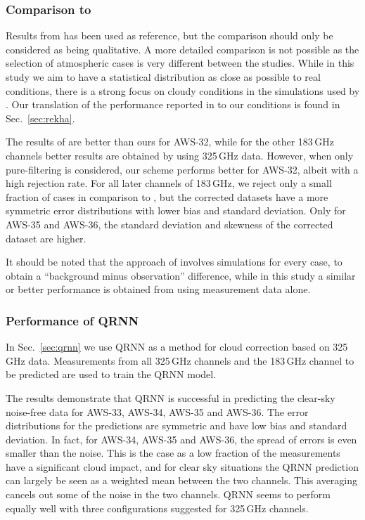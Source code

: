 \documentclass[12pt]{article}
\begin{document}
\subsubsection{Comparison to \citet{rekha2012potential}}
%
Results from \citet{rekha2012potential} has been used as reference, but the
comparison should only be considered as being qualitative. A more detailed
comparison is not possible as the selection of atmospheric cases is very
different between the studies. While in this study we aim to have a statistical
distribution as close as possible to real conditions, there is a strong focus on
cloudy conditions in the simulations used by \citet{rekha2012potential}. Our
translation of the performance reported in \citet{rekha2012potential} to our
conditions is found in Sec.~\ref{sec:rekha}.

The results of \citet{rekha2012potential} are better than ours for AWS-32, while
for the other 183\,GHz channels better results are obtained by using 325\,GHz
data. However, when only pure-filtering is considered, our scheme performs
better for AWS-32, albeit with a high rejection rate. For all later channels of
183\,GHz, we reject only a small fraction of cases in comparison to
\citet{rekha2012potential}, but the corrected datasets have a more symmetric error
distributions with lower bias and standard deviation. Only for AWS-35 and AWS-36,
the standard deviation and skewness of the corrected dataset are higher.

It should be noted that the approach of \citet{rekha2012potential} involves
simulations for every case, to obtain a ``background minus observation''
difference, while in this study a similar or better performance is obtained
from using measurement data alone. 

\subsubsection{Performance of QRNN}
In Sec.~\ref{sec:qrnn} we use QRNN as a method for cloud correction based on
325\,GHz data. Measurements from all 325\,GHz channels and the 183\,GHz channel
to be predicted are used to train the QRNN model.

The results demonstrate that QRNN is successful in predicting the clear-sky
noise-free data for AWS-33, AWS-34, AWS-35 and AWS-36. The error distributions
for the predictions are symmetric and have low bias and standard deviation. In
fact, for AWS-34, AWS-35 and AWS-36, the spread of errors is even smaller than
the noise. This is the case as a low fraction of the measurements have a
significant cloud impact, and for clear sky situations the QRNN prediction can
largely be seen as a weighted mean between the two channels. This averaging
cancels out some of the noise in the two channels. QRNN seems to perform
equally well with three configurations suggested for 325\,GHz channels.
\end{document}
